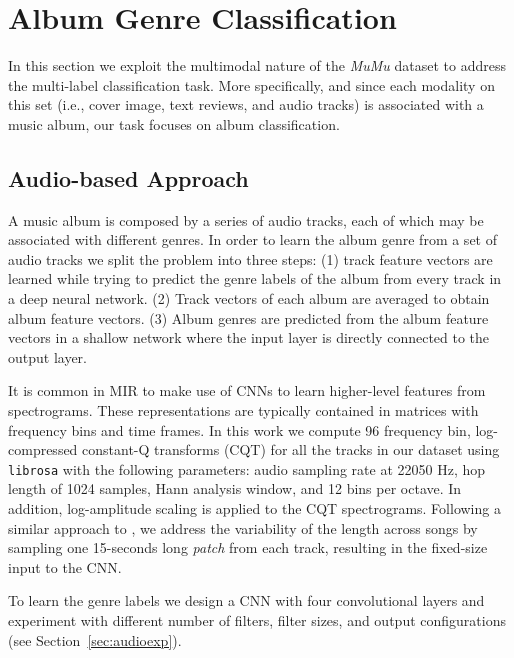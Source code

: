 \documentclass{article}
\begin{document}
\section{Album Genre Classification}\label{sec:classification}

In this section we exploit the multimodal nature of the \emph{MuMu} dataset to address the multi-label classification task.
More specifically, and since each modality on this set (i.e., cover image, text reviews, and audio tracks) is associated with a music album, our task focuses on album classification. 














\subsection{Audio-based Approach}\label{sec:audio}

A music album is composed by a series of audio tracks, each of which may be associated with different genres. In order to learn the album genre from a set of audio tracks we split the problem into three steps: (1) track feature vectors are learned while trying to predict the genre labels of the album from every track in a deep neural network. (2) Track vectors of each album are averaged to obtain album feature vectors.
(3) Album genres are predicted from the album feature vectors in a shallow network where the input layer is directly connected to the output layer.

It is common in MIR to make use of CNNs to learn higher-level features from spectrograms. 
These representations are typically contained in  matrices with  frequency bins and  time frames.
In this work we compute 96 frequency bin, log-compressed constant-Q transforms (CQT) \cite{Schorkhuber2010} for all the tracks in our dataset using \texttt{librosa} \cite{Mcfee2015} with the following parameters: audio sampling rate at 22050 Hz, hop length of 1024 samples, Hann analysis window, and 12 bins per octave.
In addition, log-amplitude scaling is applied to the CQT spectrograms.
Following a similar approach to \cite{Oord2013}, we address the variability of the length  across songs by sampling one 15-seconds long \emph{patch} from each track, resulting in the fixed-size input to the CNN.

To learn the genre labels we design a CNN with four convolutional layers and experiment with different number of filters, filter sizes, and output configurations (see Section~\ref{sec:audioexp}).
\end{document}
